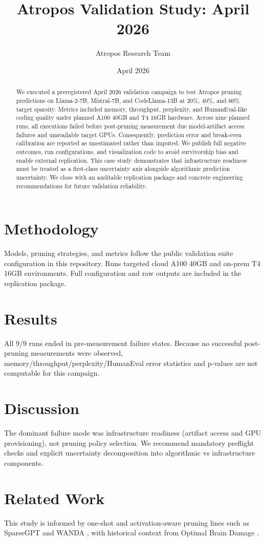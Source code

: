 \documentclass[11pt]{article}
\title{Atropos Validation Study: April 2026}
\author{Atropos Research Team}
\date{April 2026}
\begin{document}
\maketitle

\begin{abstract}
We executed a preregistered April 2026 validation campaign to test Atropos pruning predictions on Llama-2-7B, Mistral-7B, and CodeLlama-13B at 20\%, 40\%, and 60\% target sparsity. Metrics included memory, throughput, perplexity, and HumanEval-like coding quality under planned A100 40GB and T4 16GB hardware. Across nine planned runs, all executions failed before post-pruning measurement due model-artifact access failures and unavailable target GPUs. Consequently, prediction error and break-even calibration are reported as unestimated rather than imputed. We publish full negative outcomes, run configurations, and visualization code to avoid survivorship bias and enable external replication. This case study demonstrates that infrastructure readiness must be treated as a first-class uncertainty axis alongside algorithmic prediction uncertainty. We close with an auditable replication package and concrete engineering recommendations for future validation reliability.
\end{abstract}

\section{Methodology}
Models, pruning strategies, and metrics follow the public validation suite configuration in this repository. Runs targeted cloud A100 40GB and on-prem T4 16GB environments. Full configuration and raw outputs are included in the replication package.

\section{Results}
All 9/9 runs ended in pre-measurement failure states. Because no successful post-pruning measurements were observed, memory/throughput/perplexity/HumanEval error statistics and p-values are not computable for this campaign.

\section{Discussion}
The dominant failure mode was infrastructure readiness (artifact access and GPU provisioning), not pruning policy selection. We recommend mandatory preflight checks and explicit uncertainty decomposition into algorithmic vs infrastructure components.

\section{Related Work}
This study is informed by one-shot and activation-aware pruning lines such as SparseGPT \cite{sparsegpt} and WANDA \cite{wanda}, with historical context from Optimal Brain Damage \cite{obd}.



\end{document}
